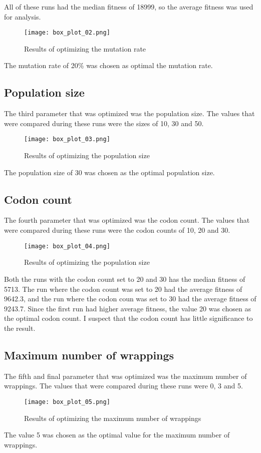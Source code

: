 All of these runs had the median fitness of 18999, so the average fitness was used for analysis.

\begin{figure}[H]
	\centering
	\texttt{[image: box\_plot\_02.png]}
	\caption{Results of optimizing the mutation rate}
\end{figure}

The mutation rate of 20\% was chosen as optimal the mutation rate.

\subsection{Population size}
The third parameter that was optimized was the population size. The values that were compared during these runs were the sizes of 10, 30 and 50.

\begin{figure}[H]
	\centering
	\texttt{[image: box\_plot\_03.png]}
	\caption{Results of optimizing the population size}
\end{figure}

The population size of 30 was chosen as the optimal population size.

\subsection{Codon count}
The fourth parameter that was optimized was the codon count. The values that were compared during these runs were the codon counts of 10, 20 and 30.

\begin{figure}[H]
	\centering
	\texttt{[image: box\_plot\_04.png]}
	\caption{Results of optimizing the population size}
\end{figure}

Both the runs with the codon count set to 20 and 30 has the median fitness of 5713. The run where the codon count was set to 20 had the average fitness of 9642.3, and the run where the codon coun was set to 30 had the average fitness of 9243.7. Since the first run had higher average fitness, the value 20 was chosen as the optimal codon count. I suspect that the codon count has little significance to the result.

\subsection{Maximum number of wrappings}
The fifth and final parameter that was optimized was the maximum number of wrappings. The values that were compared during these runs were 0, 3 and 5.

\begin{figure}[H]
	\centering
	\texttt{[image: box\_plot\_05.png]}
	\caption{Results of optimizing the maximum number of wrappings}
\end{figure}

The value 5 was chosen as the optimal value for the maximum number of wrappings.